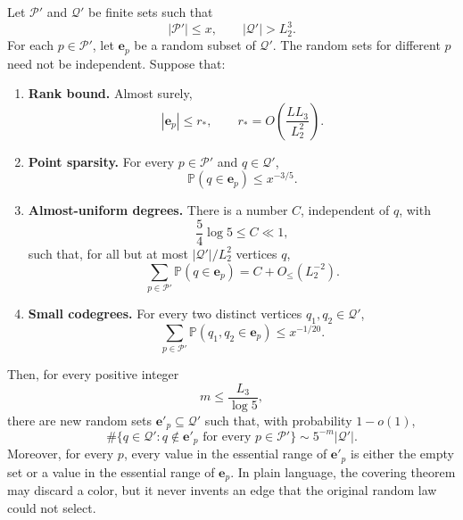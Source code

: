 \documentclass[10pt,letterpaper]{article}
\newcommand{\PP}{\mathbb{P}}
\newcommand{\QQ}{\mathcal{Q}}
\begin{document}
Let $\mathcal{P}'$ and $\QQ'$ be finite sets such that
\begin{equation}
|\mathcal{P}'|\le x,\qquad|\QQ'|>L_2^3.
\tag{6.37}
\end{equation}
For each $p\in\mathcal{P}'$, let $\mathbf{e}_p$ be a random subset of $\QQ'$. The random sets for different $p$ need not be independent.
Suppose that:
\begin{enumerate}
\item \textbf{Rank bound.} Almost surely,
\begin{equation}
|\mathbf{e}_p|\le r_*,\qquad r_*=O\left(\frac{LL_3}{L_2^2}\right).
\tag{6.38}
\end{equation}
\item \textbf{Point sparsity.} For every $p\in\mathcal{P}'$ and $q\in\QQ'$,
\begin{equation}
\PP(q\in\mathbf{e}_p)\le x^{-3/5}.
\tag{6.39}
\end{equation}
\item \textbf{Almost-uniform degrees.} There is a number $C$, independent of $q$, with
\begin{equation}
\frac54\log5\le C\ll1,
\tag{6.40}
\end{equation}
such that, for all but at most $|\QQ'|/L_2^2$ vertices $q$,
\begin{equation}
\sum_{p\in\mathcal{P}'}\PP(q\in\mathbf{e}_p)=C+O_{\le}(L_2^{-2}).
\tag{6.41}
\end{equation}
\item \textbf{Small codegrees.} For every two distinct vertices $q_1,q_2\in\QQ'$,
\begin{equation}
\sum_{p\in\mathcal{P}'}\PP(q_1,q_2\in\mathbf{e}_p)\le x^{-1/20}.
\tag{6.42}
\end{equation}
\end{enumerate}
Then, for every positive integer
\begin{equation}
m\le\frac{L_3}{\log5},
\tag{6.43}
\end{equation}
there are new random sets $\mathbf{e}'_p\subseteq\QQ'$ such that, with probability $1-o(1)$,
\begin{equation}
\#\{q\in\QQ':q\notin\mathbf{e}'_p\text{ for every }p\in\mathcal{P}'\}\sim5^{-m}|\QQ'|.
\tag{6.44}
\end{equation}
Moreover, for every $p$, every value in the essential range of $\mathbf{e}'_p$ is either the empty set or a value in the essential
range of $\mathbf{e}_p$. In plain language, the covering theorem may discard a color, but it never invents an edge that the
original random law could not select.
\end{document}
